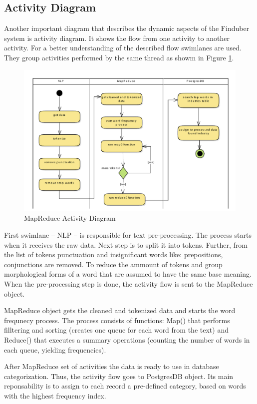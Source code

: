 \subsection{Activity Diagram}

Another important diagram that describes the dynamic aspects of the Finduber system is activity diagram. It shows the flow from one activity to another activity. For a better understanding of the described flow swimlanes are used. They group activities performed by the same thread as showm in Figure \ref{doc_uml}. 

\begin{figure}[!ht]
\centering
\includegraphics[width=15cm]{MapReduce}
\caption{MapReduce Activity Diagram}\label{doc_uml}
\end{figure}

First swimlane -- NLP -- is responsible for text pre-processing. The process starts when it receives the raw data. Next step is to split it into tokens. Further, from the list of tokens punctuation and insignificant words like: prepositions, conjunctions are removed. To reduce the ammount of tokens and group morphological forms of a word that are assumed to have the same base meaning. When the pre-processing step is done, the activity flow is sent to the MapReduce object. 

MapReduce object gets the cleaned and tokenized data and starts the word frequnecy process. The process consists of functions: Map() that performs filltering and sorting (creates one queue for each word from the text) and Reduce() that executes a summary operations 
(counting the number of words in each queue, yielding frequencies). 

After MapReduce set of activities the data is ready to use in database categorization. Thus, the activity flow goes to PostgresDB object. Its main reponsability is to assign to each record a pre-defined category, based on words with the highest frequency index. 

